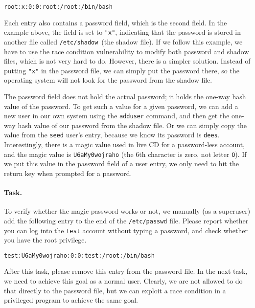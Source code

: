 \begin{lstlisting}
root:x:0:0:root:/root:/bin/bash
\end{lstlisting}

Each entry also contains a password field, which is the second field. In the example above, the
field is set to \texttt{"x"}, indicating that the password is stored in another file called
\texttt{/etc/shadow}~(the shadow file). If we follow this example, we have to use the race condition
vulnerability to modify both password and shadow files, which is not
very hard to do. However, there is a simpler solution. Instead of putting \texttt{"x"} in the
password file, we can simply put the password there, so the operating system will not look for
the password from the shadow file.

The password field does not hold the actual password; it holds the one-way hash value of the
password. To get such a value for a given password, we can add a new user in our own system using
the \texttt{adduser} command, and then get the one-way hash value of our password from
the shadow file.  Or we can simply copy the value from the \texttt{seed} user's entry,
because we know its password is \texttt{dees}. Interestingly, there is a magic value
used in \ubuntu live CD for a password-less account, and the magic value is
\texttt{U6aMy0wojraho} (the 6th character is zero, not letter \texttt{O}). If we put this value
in the password field of a user entry, we only need to hit the return key when prompted for
a password.


\paragraph{Task.} To verify whether the magic password works or not, we
manually (as a superuser) add the following entry to the end of the \texttt{/etc/passwd} file. 
Please report whether you can log into the \texttt{test} account without
typing a password, and check whether you have the root privilege.

\begin{lstlisting}
test:U6aMy0wojraho:0:0:test:/root:/bin/bash
\end{lstlisting}

After this task, please remove this entry from the password file. In the
next task, we need to achieve this goal as a normal user. Clearly, we are
not allowed to do that directly to the password file, but we can exploit a
race condition in a privileged program to achieve the same goal.



